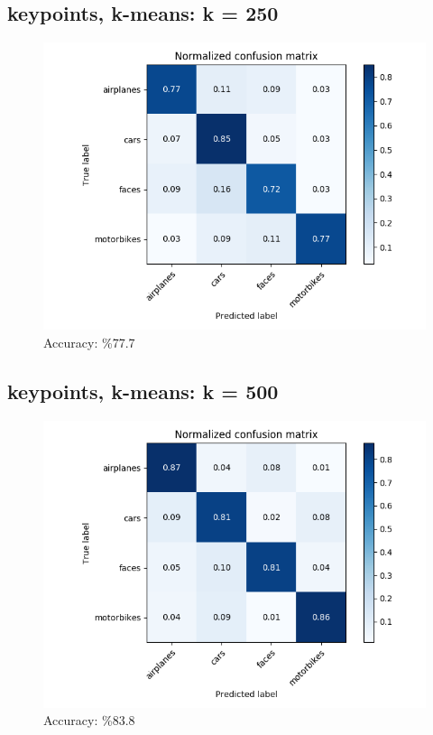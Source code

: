 \subsection*{keypoints, k-means: k = 250}
\begin{figure}[H]
    \centering
    \includegraphics[width=\textwidth]{images/confusion-kp-250.png}
    \caption*{Accuracy: \%77.7}
\end{figure}

\subsection*{keypoints, k-means: k = 500}
\begin{figure}[H]
    \centering
    \includegraphics[width=\textwidth]{images/confusion-kp-500.png}
    \caption*{Accuracy: \%83.8}
\end{figure}

